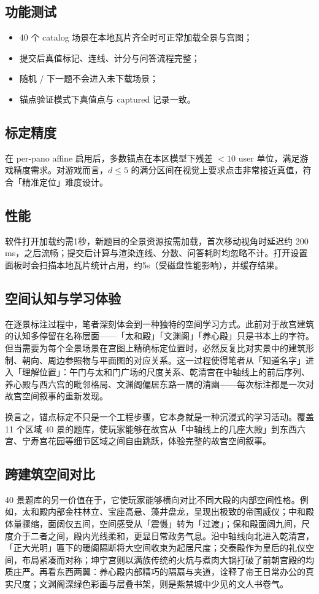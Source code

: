 \documentclass[UTF8,a4paper,12pt]{ctexart}
\begin{document}
\subsection{功能测试}
\begin{itemize}[nosep]
  \item 40 个 catalog 场景在本地瓦片齐全时可正常加载全景与宫图；
  \item 提交后真值标记、连线、计分与问答流程完整；
  \item 随机 / 下一题不会进入未下载场景；
  \item 锚点验证模式下真值点与 captured 记录一致。
\end{itemize}
\subsection{标定精度}
在 per-pano affine 启用后，多数锚点在本区模型下残差 $<10$ user 单位，满足游戏精度需求。对游戏而言，$d\le 5$ 的满分区间在视觉上要求点击非常接近真值，符合「精准定位」难度设计。
\subsection{性能}
软件打开加载约需1秒，新题目的全景资源按需加载，首次移动视角时延迟约 200\,ms，之后流畅；提交后计算与渲染连线、分数、问答耗时均忽略不计。打开设置面板时会扫描本地瓦片统计占用，约5s（受磁盘性能影响），并缓存结果。
\subsection{空间认知与学习体验}
在逐景标注过程中，笔者深刻体会到一种独特的空间学习方式。此前对于故宫建筑的认知多停留在名称层面——「太和殿」「文渊阁」「养心殿」只是书本上的字符。但当需要为每个全景场景在宫图上精确标定位置时，必然反复比对实景中的建筑形制、朝向、周边参照物与平面图的对应关系。这一过程使得笔者从「知道名字」进入「理解位置」：午门与太和门广场的尺度关系、乾清宫在中轴线上的前后序列、养心殿与西六宫的毗邻格局、文渊阁偏居东路一隅的清幽——每次标注都是一次对故宫空间叙事的重新发现。

换言之，锚点标定不只是一个工程步骤，它本身就是一种沉浸式的学习活动。覆盖 11 个区域 40 景的题库，使玩家能够在故宫从「中轴线上的几座大殿」到东西六宫、宁寿宫花园等细节区域之间自由跳跃，体验完整的故宫空间叙事。
\subsection{跨建筑空间对比}
40 景题库的另一价值在于，它使玩家能够横向对比不同大殿的内部空间性格。例如，太和殿内部金柱林立、宝座高悬、藻井盘龙，呈现出极致的帝国威仪；中和殿体量骤缩，面阔仅五间，空间感受从「震慑」转为「过渡」；保和殿面阔九间，尺度介于二者之间，殿内光线柔和，更显日常政务气息。沿中轴线向北进入乾清宫，「正大光明」匾下的暖阁隔断将大空间收束为起居尺度；交泰殿作为皇后的礼仪空间，布局紧凑而对称；坤宁宫则以满族传统的火炕与煮肉大锅打破了前朝宫殿的均质庄严。再看东西两翼：养心殿内部精巧的隔扇与夹道，诠释了帝王日常办公的真实尺度；文渊阁深绿色彩画与层叠书架，则是紫禁城中少见的文人书卷气。
\end{document}
